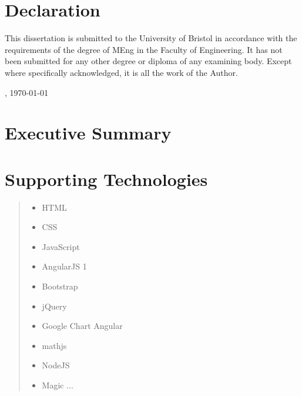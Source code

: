 \documentclass[10pt,a4paper,twoside]{book}
\begin{document}

\cleardoublepage
\pagestyle{plain}


\newpage
  \thispagestyle{plain}

  \chapter*{Declaration}

  This dissertation is submitted to the University of Bristol in accordance 
  with the requirements of the degree of MEng in the Faculty 
  of Engineering.  It has not been submitted for any other degree or diploma 
  of any examining body.  Except where specifically acknowledged, it is all 
  the work of the Author. 

  \vspace{6cm}

  , \today


\tableofcontents
\listoffigures
\listofalgorithms
\lstlistoflistings




\chapter*{Executive Summary}


\chapter*{Supporting Technologies}

\begin{quote}
\noindent
\begin{itemize}
\item HTML
\item CSS
\item JavaScript
\item AngularJS 1
\item Bootstrap
\item jQuery
\item Google Chart Angular
\item mathjs
\item NodeJS
\item Magic ...
\end{itemize}
\end{quote}
\end{document}
